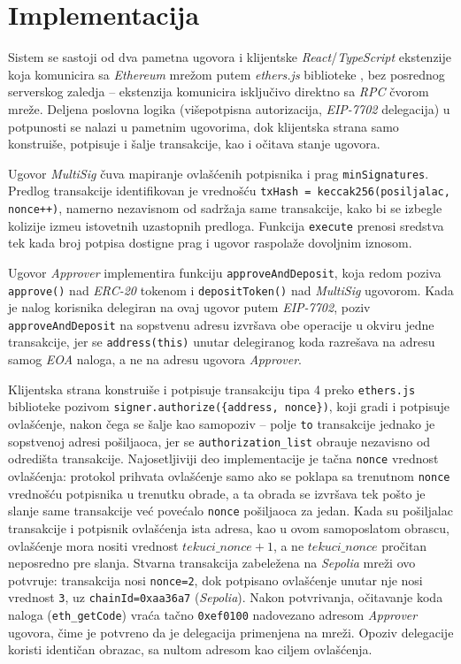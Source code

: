 \documentclass[10pt,a4paper]{article}
\newcommand{\en}[1]{\textit{\textenglish{#1}}}
\begin{document}
\section{Implementacija}

Sistem se sastoji od dva pametna ugovora i klijentske \en{React}/\en{TypeScript} ekstenzije koja komunicira sa \en{Ethereum} mre\v zom putem \en{ethers.js} biblioteke \cite{ethersu}, bez posrednog serverskog zaledja -- ekstenzija komunicira isklju\v civo direktno sa \en{RPC} \v cvorom mre\v ze. Deljena poslovna logika (vi\v sepotpisna autorizacija, \en{EIP-7702} delegacija) u potpunosti se nalazi u pametnim ugovorima, dok klijentska strana samo konstrui\v se, potpisuje i \v salje transakcije, kao i o\v citava stanje ugovora.

Ugovor \en{MultiSig} \v cuva mapiranje ovla\v s\'cenih potpisnika i prag \texttt{minSignatures}. Predlog transakcije identifikovan je vredno\v s\' cu \texttt{txHash = keccak256(posiljalac, nonce++)}, namerno nezavisnom od sadr\v zaja same transakcije, kako bi se izbegle kolizije izme\dj u istovetnih uzastopnih predloga. Funkcija \texttt{execute} prenosi sredstva tek kada broj potpisa dostigne prag i ugovor raspola\v ze dovoljnim iznosom.

Ugovor \en{Approver} implementira funkciju \texttt{approveAndDeposit}, koja redom poziva \texttt{approve()} nad \en{ERC-20} tokenom i \texttt{depositToken()} nad \en{MultiSig} ugovorom. Kada je nalog korisnika delegiran na ovaj ugovor putem \en{EIP-7702}, poziv \texttt{approveAndDeposit} na sopstvenu adresu izvr\v sava obe operacije u okviru jedne transakcije, jer se \texttt{address(this)} unutar delegiranog koda razre\v sava na adresu samog \en{EOA} naloga, a ne na adresu ugovora \en{Approver}.

Klijentska strana konstrui\v se i potpisuje transakciju tipa 4 preko \texttt{ethers.js} biblioteke \cite{ethersu} pozivom \texttt{signer.authorize(\{address, nonce\})}, koji gradi i potpisuje ovla\v s\'cenje, nakon \v cega se \v salje kao samopoziv -- polje \texttt{to} transakcije jednako je sopstvenoj adresi po\v siljaoca, jer se \texttt{authorization\_list} obra\dj uje nezavisno od odredi\v sta transakcije. Najosetljiviji deo implementacije je ta\v cna \texttt{nonce} vrednost ovla\v s\'cenja: protokol prihvata ovla\v s\'cenje samo ako se poklapa sa trenutnom \texttt{nonce} vredno\v s\'cu potpisnika u trenutku obrade, a ta obrada se izvr\v sava tek po\v sto je slanje same transakcije ve\'c pove\'calo \texttt{nonce} po\v siljaoca za jedan. Kada su po\v siljalac transakcije i potpisnik ovla\v s\'cenja ista adresa, kao u ovom samoposlatom obrascu, ovla\v s\'cenje mora nositi vrednost $tekuci\_nonce + 1$, a ne $tekuci\_nonce$ pro\v citan neposredno pre slanja. Stvarna transakcija zabele\v zena na \en{Sepolia} mre\v zi ovo potvr\dj uje: transakcija nosi \texttt{nonce=2}, dok potpisano ovla\v s\'cenje unutar nje nosi vrednost \texttt{3}, uz \texttt{chainId=0xaa36a7} (\en{Sepolia}). Nakon potvr\dj ivanja, o\v citavanje koda naloga (\texttt{eth\_getCode}) vra\'ca ta\v cno \texttt{0xef0100} nadovezano adresom \en{Approver} ugovora, \v cime je potvr\dj eno da je delegacija primenjena na mre\v zi. Opoziv delegacije koristi identi\v can obrazac, sa nultom adresom kao ciljem ovla\v s\'cenja.
\end{document}
